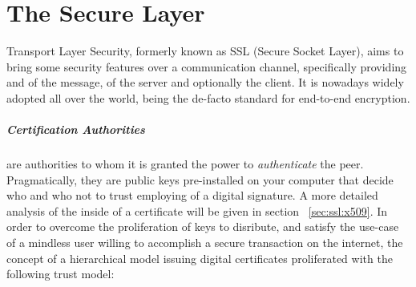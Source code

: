 \chapter{The Secure Layer \label{chap:ssl}}

Transport Layer Security, formerly known as SSL (Secure Socket Layer), aims
to bring some security features over a communication channel, specifically
providing  and  of the message,  of the server and
optionally the client.
It is nowadays widely adopted all over the world, being the de-facto standard for
end-to-end  encryption.

\paragraph{Certification Authorities} are authorities to whom it is granted the
power to \emph{authenticate} the peer. Pragmatically, they are public keys
pre-installed on your computer that decide who and who not to trust employing
of a digital signature. A more detailed analysis of the inside of a certificate
will be given in section ~\ref{sec:ssl:x509}.
In order to overcome the proliferation of keys to disribute, and satisfy the
use-case of a mindless user willing to accomplish a secure transaction on the
internet, the concept of a hierarchical model issuing digital certificates
proliferated with the following trust model:
\\
\\
\begin{center}
\end{center}



